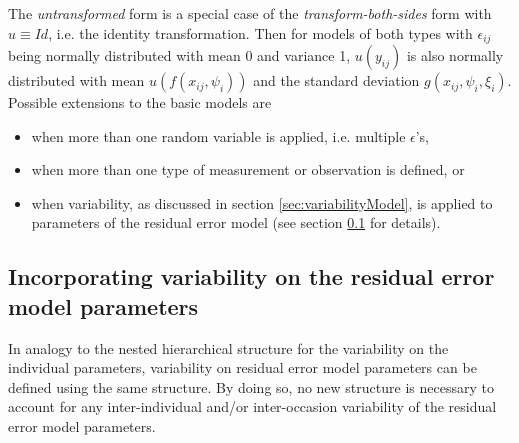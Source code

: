 The \textit{untransformed} form is a special case of the \textit{transform-both-sides} form with $u \equiv Id$, i.e. the identity transformation.
Then for models of both types with $\epsilon_{ij}$ being normally distributed with mean 0 and variance 1, $u(y_{ij})$ is also normally distributed
with mean $u(f(x_{ij}, \psi_{i}))$ and the standard deviation $g(x_{ij}, \psi_{i}, \xi_i)$. \\
Possible extensions to the basic models are
\begin{itemize}
\item
when more than one random variable is applied, i.e. multiple $\epsilon$'s,
\item
when more than one type of measurement or observation is defined, or
\item
when variability, as discussed in section \ref{sec:variabilityModel}, is applied to parameters of the residual error model (see section \ref{subsec:varModelResidualError} for details).
\end{itemize}


\subsection{Incorporating variability on the residual error model parameters}
\label{subsec:varModelResidualError}
In analogy to the nested hierarchical structure for the variability on the individual parameters,
variability on residual error model parameters can be defined using the same structure.
By doing so, no new structure is necessary to account for any inter-individual and/or inter-occasion variability of the residual error model parameters.

